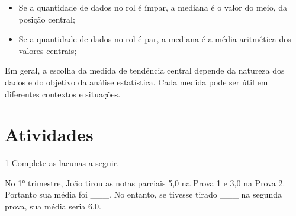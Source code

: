 \begin{escolha}
\begin{boxmedio}
\begin{boxmedio}
{\begin{boxpeq}
\begin{boxpeq}
{\begin{boxpeq}
\begin{boxmedio}
\begin{boxmedio}
\begin{boxpeq}
\begin{boxmedio}
\begin{boxpeq}
\begin{boxpeq}
\begin{boxpeq}
\begin{boxpeq}
\begin{boxmedio}
{\begin{boxmedio}
\begin{boxmedio}
\begin{boxpeq}
\begin{boxmedio}
\begin{boxpeq}
\begin{boxpeq}
\begin{boxpeq}
\begin{escolha}
{\begin{boxmedio}
\begin{boxpeq}
\begin{boxpeq}
\begin{boxpeq}
\begin{boxpeq}
\begin{boxpeq}
\begin{boxmedio}
\begin{boxpeq}
\begin{boxpeq}
\begin{boxpeq}
{\begin{boxpeq}
\begin{boxmedio}
\begin{boxpeq}
\begin{boxpeq}
\begin{boxpeq}
{\begin{boxpeq}
\begin{boxmedio}
{\begin{boxpeq}
\begin{boxpeq}
\begin{boxmedio}
\begin{boxmedio}
\begin{boxpeq}
\begin{boxpeq}
{\begin{boxpeq}
\begin{boxpeq}
\begin{boxpeq}
\begin{boxpeq}
\begin{boxpeq}
\begin{escolha}
\begin{escolha}
{\begin{boxmedio}
\begin{boxpeq}
\begin{q°}
\begin{boxmedio}
\begin{boxpeq}
\begin{boxpeq}
\begin{boxmedio}
\begin{boxmedio}
\begin{boxmedio}
{\begin{itemize}
\item
  Se a quantidade de dados no rol é ímpar, a mediana é o valor do meio,
  da posição central;
\item
  Se a quantidade de dados no rol é par, a mediana é a média aritmética
  dos valores centrais;
\end{itemize}

Em geral, a escolha da medida de tendência central depende da natureza
dos dados e do objetivo da análise estatística. Cada medida pode ser
útil em diferentes contextos e situações.
}

\section{Atividades}

\num{1} Complete as lacunas a seguir.

No 1° trimestre, João tirou as notas parciais 5,0 na Prova 1 e 3,0 na
Prova 2. Portanto sua média foi \_\_\_. No entanto, se tivesse tirado
\_\_\_ na segunda prova, sua média seria 6,0.




\end{boxmedio}
\end{boxmedio}
\end{boxmedio}
\end{boxpeq}
\end{boxpeq}
\end{boxmedio}
\end{q°}
\end{boxpeq}
\end{boxmedio}}
\end{escolha}
\end{escolha}
\end{boxpeq}
\end{boxpeq}
\end{boxpeq}
\end{boxpeq}
\end{boxpeq}}
\end{boxpeq}
\end{boxpeq}
\end{boxmedio}
\end{boxmedio}
\end{boxpeq}
\end{boxpeq}}
\end{boxmedio}
\end{boxpeq}}
\end{boxpeq}
\end{boxpeq}
\end{boxpeq}
\end{boxmedio}
\end{boxpeq}}
\end{boxpeq}
\end{boxpeq}
\end{boxpeq}
\end{boxmedio}
\end{boxpeq}
\end{boxpeq}
\end{boxpeq}
\end{boxpeq}
\end{boxpeq}
\end{boxmedio}}
\end{escolha}
\end{boxpeq}
\end{boxpeq}
\end{boxpeq}
\end{boxmedio}
\end{boxpeq}
\end{boxmedio}
\end{boxmedio}}
\end{boxmedio}
\end{boxpeq}
\end{boxpeq}
\end{boxpeq}
\end{boxpeq}
\end{boxmedio}
\end{boxpeq}
\end{boxmedio}
\end{boxmedio}
\end{boxpeq}}
\end{boxpeq}
\end{boxpeq}}
\end{boxmedio}
\end{boxmedio}
\end{escolha}
